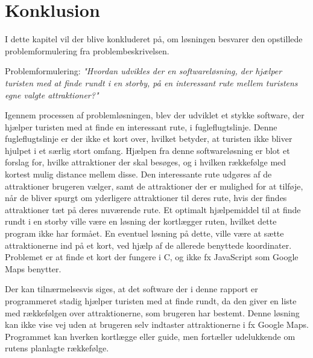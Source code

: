 \chapter{Konklusion}
I dette kapitel vil der blive konkluderet på, om løsningen besvarer den opstillede problemformulering fra problembeskrivelsen.

Problemformulering:\newline
\textit{"Hvordan udvikles der en softwareløsning, der hjælper turisten med at finde rundt i en storby, på en interessant rute mellem turistens egne valgte attraktioner?"}

Igennem processen af problemløsningen, blev der udviklet et stykke software, der hjælper turisten med at finde en interessant rute, i fugleflugtslinje. Denne fugleflugtslinje er der ikke et kort over, hvilket betyder, at turisten ikke bliver hjulpet i et særlig stort omfang. Hjælpen fra denne softwareløsning er blot et forslag for, hvilke attraktioner der skal besøges, og i hvilken rækkefølge med kortest mulig distance mellem disse. Den interessante rute udgøres af de attraktioner brugeren vælger, samt de attraktioner der er mulighed for at tilføje, når de bliver spurgt om yderligere attraktioner til deres rute, hvis der findes attraktioner tæt på deres nuværende rute.\newline
Et optimalt hjælpemiddel til at finde rundt i en storby ville være en løsning der kortlægger ruten, hvilket dette program ikke har formået. En eventuel løsning på dette, ville være at sætte attraktionerne ind på et kort, ved hjælp af de allerede benyttede koordinater. Problemet er at finde et kort der fungere i C, og ikke fx JavaScript som Google Maps benytter.

Der kan tilnærmelsesvis siges, at det software der i denne rapport er programmeret stadig hjælper turisten med at finde rundt, da den giver en liste med rækkefølgen over attraktionerne, som brugeren har bestemt. Denne løsning kan ikke vise vej uden at brugeren selv indtaster attraktionerne i fx Google Maps. Programmet kan hverken kortlægge eller guide, men fortæller udelukkende om rutens planlagte rækkefølge.